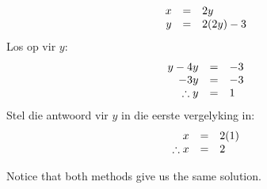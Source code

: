 \begin{equation*}
\begin{array}{ccl}\hfill x& =& 2y\hfill \\
 \hfill y& =& 2(2y)-3\hfill 
\end{array}
\end{equation*}
Los op vir $y$:
\begin{equation*}
\begin{array}{ccl}
 \hfill y-4y& =& -3\hfill \\
 \hfill -3y& =& -3\hfill \\ 
\hfill \therefore y& =& 1\hfill 
\end{array}
\end{equation*}
Stel die antwoord vir $y$ in die eerste vergelyking in:
\begin{equation*}
\begin{array}{ccl}
 \hfill x& =& 2(1)\hfill \\
 \therefore x&=& 2\hfill \end{array}
\end{equation*}

Notice that both methods give us the same solution.

